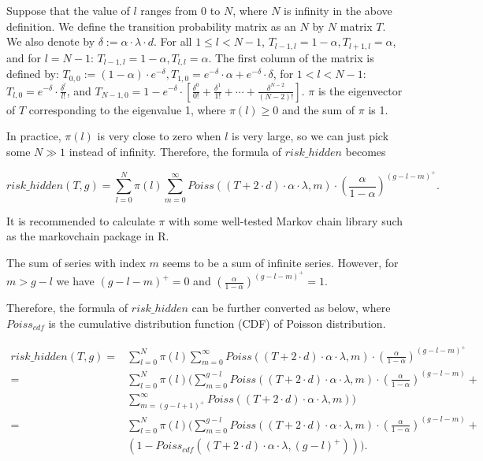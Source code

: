 \documentclass[a4paper,11pt]{article}
\begin{document}
Suppose that the value of $l$ ranges from 0 to $N$, where $N$ is infinity in the
above definition. We define the transition probability matrix as an $N$ by $N$
matrix $T$. We also denote by $\delta := \alpha \cdot \lambda \cdot d$. For all
$1 \leq l < N - 1$, $T_{l-1,l} = 1 - \alpha, T_{l+1,l} = \alpha$, and for $l = N
- 1$: $T_{l-1,l} = 1 - \alpha, T_{l,l} = \alpha$. The first column of the matrix
is defined by: $T_{0,0} := (1 - \alpha) \cdot e^{-\delta}, T_{1,0} = e^{-\delta}
\cdot \alpha + e^{-\delta} \cdot \delta$, for $1 < l < N - 1$: $T_{l,0} =
e^{-\delta} \cdot \frac{\delta^l}{l!}$, and $T_{N-1,0} = 1 - e^{-\delta} \cdot
\left[\frac{\delta^0}{0!} + \frac{\delta^1}{1!} + \cdots +
\frac{\delta^{N-2}}{(N-2)!}\right]$.  $\pi$ is the eigenvector of $T$
corresponding to the eigenvalue 1, where $\pi(l) \geq 0$ and the sum of $\pi$ is
1.

In practice, $\pi(l)$ is very close to zero when $l$ is very large, so we can
just pick some $N \gg 1$ instead of infinity. Therefore, the formula of
$risk\_hidden$ becomes

$$
risk\_hidden(T,g) = \sum_{l=0}^{N} \pi(l) \sum_{m=0}^{\infty} Poiss((T + 2 \cdot
d) \cdot \alpha \cdot \lambda, m) \cdot \left(\frac{\alpha}{1-\alpha}\right)^{(g
- l - m)^+}.
$$

It is recommended to calculate $\pi$ with some well-tested Markov chain library such
as the markovchain package in R.

The sum of series with index $m$ seems to be a sum of infinite series. However,
for $m > g - l$ we have $(g - l - m)^+ = 0$ and
$\left(\frac{\alpha}{1-\alpha}\right)^{(g - l - m)^+} = 1$.

Therefore, the formula of $risk\_hidden$ can be further converted as below,
where $Poiss_{cdf}$ is the cumulative distribution function (CDF) of Poisson
distribution.

\begin{align*}
risk\_hidden(T,g)
=& \sum_{l=0}^{N}\pi(l)\sum_{m=0}^{\infty}Poiss((T+2 \cdot d) \cdot \alpha \cdot \lambda, m) \cdot (\frac{\alpha}{1-\alpha})^{(g-l-m)^+} \\
=& \sum_{l=0}^{N}\pi(l) (\sum_{m=0}^{g-l}Poiss((T+2 \cdot d) \cdot \alpha
	\cdot \lambda, m) \cdot (\frac{\alpha}{1-\alpha})^{(g-l-m)} + \\
& \sum_{m=(g-l+1)^+}^{\infty}Poiss((T+2 \cdot d) \cdot \alpha \cdot \lambda, m)) \\
=& \sum_{l=0}^{N}\pi(l) ( \sum_{m=0}^{g-l}Poiss((T+2 \cdot d) \cdot
	\alpha \cdot \lambda, m) \cdot (\frac{\alpha}{1-\alpha})^{(g-l-m)} + \\
& (1 - Poiss_{cdf} ((T+2 \cdot d) \cdot \alpha \cdot \lambda, (g-l)^+))).
\end{align*}
\end{document}
